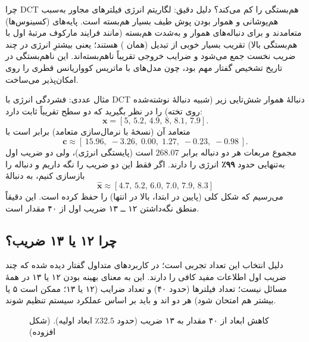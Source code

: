 \begin{correctionbox}{چرا DCT هم‌بستگی را کم می‌کند؟}
دلیل دقیق: لگاریتم انرژی فیلترهای مجاور به‌سبب هم‌پوشانی و هموار بودن پوش طیف بسیار هم‌بسته است. پایه‌های  (کسینوس‌ها) متعامدند و برای دنباله‌های هموار و به‌شدت هم‌بسته (مانند فرایند مارکوف مرتبهٔ اول با هم‌بستگی بالا) تقریب بسیار خوبی از تبدیل  (همان ) هستند؛ یعنی بیشترِ انرژی در چند ضریب نخست جمع می‌شود و ضرایب خروجی تقریباً ناهم‌بسته‌اند. این ناهم‌بستگی در تاریخ تشخیص گفتار مهم بود، چون مدل‌های  با ماتریس کوواریانس قطری را روی  امکان‌پذیر می‌ساخت.
\end{correctionbox}

\begin{addedbox}{مثال عددی: فشردگی انرژی با DCT}
دنبالهٔ هموار شش‌تایی زیر (شبیه دنبالهٔ نوشته‌شده روی تخته) را در نظر بگیرید که دو سطح تقریباً ثابت دارد:
\[\mathbf{x}=[5,\,5.2,\,4.9,\,8,\,8.1,\,7.9].\]
 متعامد آن (نسخهٔ  با نرمال‌سازی متعامد) برابر است با
\[
\mathbf{c}\approx[\,15.96,\;-3.26,\;0.00,\;1.27,\;-0.23,\;-0.98\,].
\]
مجموع مربعات هر دو دنباله برابر $268.07$ است (پایستگی انرژی)، ولی دو ضریب اول به‌تنهایی حدود \textbf{۹۹٪} انرژی را دارند. اگر فقط این دو ضریب را نگه داریم و دنباله را بازسازی کنیم، به دنبالهٔ
\[\hat{\mathbf{x}}\approx[4.7,\,5.2,\,6.0,\,7.0,\,7.9,\,8.3]\]
می‌رسیم که شکل کلی (پایین در ابتدا، بالا در انتها) را حفظ کرده است. این دقیقاً منطق نگه‌داشتن ۱۲ ــ ۱۳ ضریب اول از ۴۰ مقدار است.
\end{addedbox}

\subsection{چرا ۱۲ یا ۱۳ ضریب؟}
دلیل انتخاب این تعداد تجربی است؛ در کاربردهای متداول گفتار دیده شده که چند ضریب اول اطلاعات مفید کافی را دارند. این به معنای بهینه بودن ۱۲ یا ۱۳ در همهٔ مسائل نیست؛ تعداد فیلترها (حدود ۴۰) و تعداد ضرایب (۱۲ یا ۱۳؛ ممکن است ۵ یا بیشتر هم امتحان شود) هر دو اند و باید بر اساس عملکرد سیستم تنظیم شوند.

\begin{figure}[htbp]
  \centering
  \caption{کاهش ابعاد از ۴۰ مقدار به ۱۳ ضریب (حدود $32.5$٪ ابعاد اولیه). (شکل افزوده)}
\end{figure}

